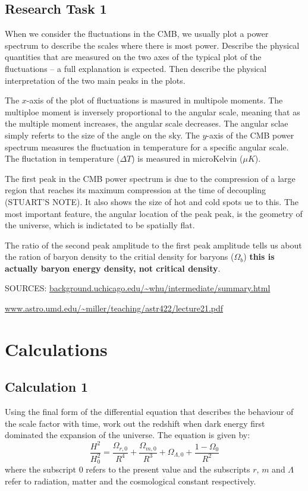 \documentclass[a4paper]{article} %
\begin{document}
\subsection{Research Task 1}
\begin{framed}
When we consider the fluctuations in the CMB, we usually plot a power spectrum to describe the scales where there is most power. Describe the physical quantities that are measured on the two axes of the typical plot of the fluctuations – a full explanation is expected. Then describe the physical interpretation of the two main peaks in the plots.
\end{framed}

The $x$-axis of the plot of fluctuations is masured in multipole moments. The multiploe moment is inversely proportional to the angular scale, meaning that as the multiple moment increases, the angular scale decreases. The angular sclae simply referts to the size of the angle on the sky. The $y$-axis of the CMB power spectrum measures the fluctuation in temperature for a specific angular scale. The fluctation in temperature ($\Delta T$) is measured in microKelvin ($\mu K$).

The first peak in the CMB power spectrum is due to the compression of a large region that reaches its maximum compression at the time of decoupling (STUART'S NOTE). It also shows the size of hot and cold spots ue to this. The most important feature, the angular location of the peak peak, is the geometry of the universe, which is indictated to be spatially flat.

The ratio of the second peak amplitude to the first peak amplitude tells us about the ration of baryon density to the critial density for baryons ($\Omega_b$) \textbf{this is actually baryon energy density, not critical density}.

SOURCES:
\url{background.uchicago.edu/~whu/intermediate/summary.html}

\url{www.astro.umd.edu/~miller/teaching/astr422/lecture21.pdf}


\section{Calculations}

\subsection{Calculation 1}
\begin{framed}
Using the final form of the differential equation that describes the behaviour of the scale factor with time, work out the redshift when dark energy first dominated the expansion of the universe. The equation is given by:
\begin{equation*}
\frac{H^2}{H_0^2}=\frac{\Omega_{r,0}}{R^4}+\frac{\Omega_{m,0}}{R^3}
+\Omega_{\Lambda,0}+\frac{1-\Omega_{0}}{R^2}
\end{equation*}
where the subscript $0$ refers to the present
value and the subscripts $r$, $m$ and $\Lambda$ refer to radiation, matter and the cosmological constant respectively.
\end{framed}
\end{document}
